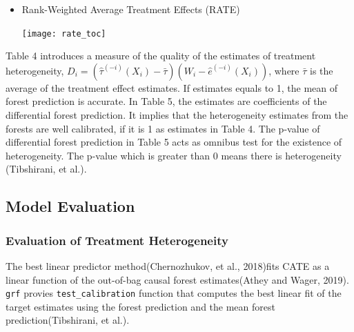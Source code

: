 \documentclass[11pt,a4paper]{article}
\let\origfigure\figure
\let\endorigfigure\endfigure
\renewenvironment{figure}[1][2] {
    \expandafter\origfigure\expandafter[H]
} {
    \endorigfigure
}
\begin{document}
\begin{itemize} 
\item Rank-Weighted Average Treatment Effects (RATE)
\begin{figure}
\centering
\texttt{[image: rate\_toc]}
\hfill
\caption{Targeting Operator Characteristics}
\label{rate_toc}
\end{figure}
\end{itemize}

Table 4 introduces a measure of the quality of the estimates of treatment heterogeneity, $D_i = (\hat{\tau}^{(-i)}(X_i) - \bar{\tau})(W_i - \hat{e}^{(-i)}(X_i))$, where $\bar{\tau}$ is the average of the treatment effect estimates. If estimates equals to 1, the mean of forest prediction is accurate. In Table 5, the estimates are coefficients of the differential forest prediction. It implies that the heterogeneity estimates from the forests are well calibrated, if it is 1 as estimates in Table 4. The p-value of differential forest prediction in Table 5 acts as omnibus test for the existence of heterogeneity. The p-value which is greater than 0 means there is heterogeneity (Tibshirani, et al.).




\hypertarget{model-evaluation}{%
\subsection{Model Evaluation}\label{model-evaluation}}
\hypertarget{Evaluation-of-Treatment-Heterogeneity}{%
\subsubsection{Evaluation of Treatment Heterogeneity}\label{Evaluation-of-Treatment-Heterogeneity}}
The best linear predictor method(Chernozhukov, et al., 2018)fits CATE as a linear function of the out-of-bag causal forest estimates(Athey and Wager, 2019). \texttt{grf} provies \texttt{test\_calibration} function that computes the best linear fit of the target estimates using the forest prediction and the mean forest prediction(Tibshirani, et al.). \\
\end{document}

